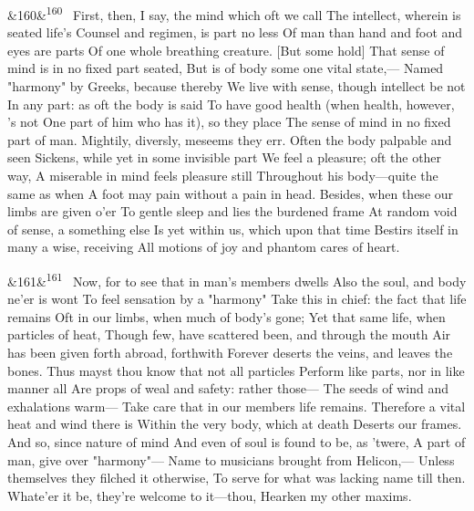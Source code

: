 \documentclass[12pt]{article}
\newcommand{\para}[1][]{\par\noindent\ifx&#1&\else\textsuperscript{\footnotesize #1}~\fi}
\begin{document}
\para[160] First, then, I say, the mind which oft we call The intellect, wherein is seated life's Counsel and regimen, is part no less Of man than hand and foot and eyes are parts Of one whole breathing creature. [But some hold] That sense of mind is in no fixed part seated, But is of body some one vital state,--- Named "harmony" by Greeks, because thereby We live with sense, though intellect be not In any part: as oft the body is said To have good health (when health, however, 's not One part of him who has it), so they place The sense of mind in no fixed part of man. Mightily, diversly, meseems they err. Often the body palpable and seen Sickens, while yet in some invisible part We feel a pleasure; oft the other way, A miserable in mind feels pleasure still Throughout his body---quite the same as when A foot may pain without a pain in head. Besides, when these our limbs are given o'er To gentle sleep and lies the burdened frame At random void of sense, a something else Is yet within us, which upon that time Bestirs itself in many a wise, receiving All motions of joy and phantom cares of heart.

\para[161] Now, for to see that in man's members dwells Also the soul, and body ne'er is wont To feel sensation by a "harmony" Take this in chief: the fact that life remains Oft in our limbs, when much of body's gone; Yet that same life, when particles of heat, Though few, have scattered been, and through the mouth Air has been given forth abroad, forthwith Forever deserts the veins, and leaves the bones. Thus mayst thou know that not all particles Perform like parts, nor in like manner all Are props of weal and safety: rather those--- The seeds of wind and exhalations warm--- Take care that in our members life remains. Therefore a vital heat and wind there is Within the very body, which at death Deserts our frames. And so, since nature of mind And even of soul is found to be, as 'twere, A part of man, give over "harmony"--- Name to musicians brought from Helicon,--- Unless themselves they filched it otherwise, To serve for what was lacking name till then. Whate'er it be, they're welcome to it---thou, Hearken my other maxims.
\end{document}
